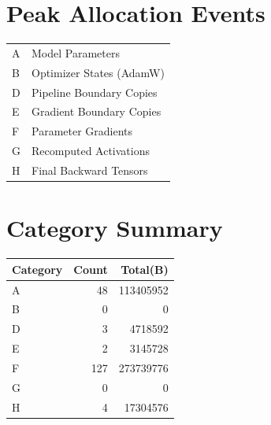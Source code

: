 \documentclass{article}
\begin{document}
\section*{Peak Allocation Events}
\small
\begin{tabular}{ll}
A & Model Parameters \\
B & Optimizer States (AdamW) \\
D & Pipeline Boundary Copies \\
E & Gradient Boundary Copies \\
F & Parameter Gradients \\
G & Recomputed Activations \\
H & Final Backward Tensors \\
\end{tabular}
\vspace{0.5em}
\section*{Category Summary}
\begin{tabular}{l r r}
Category & Count & Total(B) \\
\hline
A & 48 & 113405952 \\
B & 0 & 0 \\
D & 3 & 4718592 \\
E & 2 & 3145728 \\
F & 127 & 273739776 \\
G & 0 & 0 \\
H & 4 & 17304576 \\
\end{tabular}
\vspace{0.5em}
\end{document}
